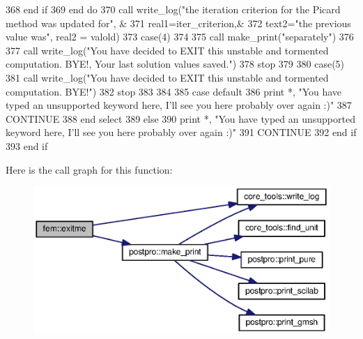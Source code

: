 \begin{DoxyCode}
368 \textcolor{keywordflow}{                end if}
369 \textcolor{keywordflow}{              end do}
370               \textcolor{keyword}{call }write_log(\textcolor{stringliteral}{"the iteration criterion for the Picard method was updated for"}\textcolor{comment}{, &}
371 \textcolor{comment}{              real1=iter_criterion,&}
372 \textcolor{comment}{              text2=}\textcolor{stringliteral}{"the previous value was"}, real2 = valold)
373             \textcolor{keywordflow}{case}(4)
374             
375               \textcolor{keyword}{call }make_print(\textcolor{stringliteral}{"separately"})
376               
377               \textcolor{keyword}{call }write_log(\textcolor{stringliteral}{"You have decided to EXIT this unstable and tormented computation. BYE!, Your
       last solution values saved."}\textcolor{comment}{)}
378 \textcolor{comment}{              stop}
379 \textcolor{comment}{            }
380 \textcolor{comment}{            }\textcolor{keywordflow}{case}(5)
381               \textcolor{keyword}{call }write_log(\textcolor{stringliteral}{"You have decided to EXIT this unstable and tormented computation. BYE!"}\textcolor{comment}{)}
382 \textcolor{comment}{              stop}
383 \textcolor{comment}{              }
384 \textcolor{comment}{            }
385 \textcolor{comment}{}\textcolor{keywordflow}{            case default}
386               print *, \textcolor{stringliteral}{"You have typed an unsupported keyword here, I'll see you here probably over again
       :)"}
387               \textcolor{keywordflow}{CONTINUE}
388 \textcolor{keywordflow}{          end select}
389         \textcolor{keywordflow}{else}
390           print *, \textcolor{stringliteral}{"You have typed an unsupported keyword here, I'll see you here probably over again :)"}
391           \textcolor{keywordflow}{CONTINUE}
392 \textcolor{keywordflow}{        end if}
393 \textcolor{keywordflow}{      end if}
\end{DoxyCode}


Here is the call graph for this function\+:\nopagebreak
\begin{figure}[H]
\begin{center}
\leavevmode
\includegraphics[width=350pt]{namespacefem_ab14ae3c1eca7662249464059ea9e8a76_cgraph}
\end{center}
\end{figure}




